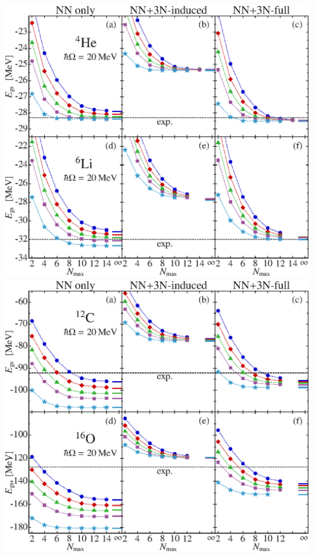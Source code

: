 \documentclass[accentcolor=tud2c,usenames,dvipsnames,colorbacktitle,inverttitle,landscape,german,presentation,t]{tudbeamer}
\begin{document}
\begin{frame}
\begin{columns}[c]
\begin{column}{0.5\textwidth}
\begin{center}
\begin{overprint}
            \includegraphics[width=\textwidth]{figures/03/roth1} \\
            \includegraphics[width=\textwidth]{figures/03/roth2} \\
          \end{overprint}
        \end{center}
      \end{column}
    \end{columns}
  \end{frame}
\end{document}
